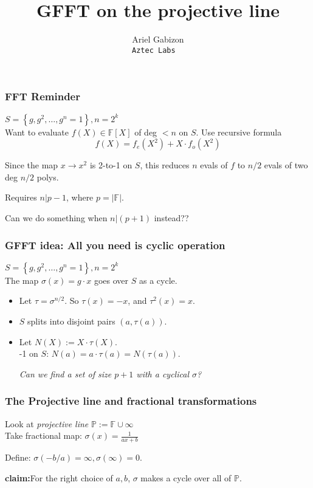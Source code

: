 \documentclass[shadesubsections,compress,14pt,mathserif]{beamer}
\title{\large{GFFT on the projective line}}    %
\author{\small{Ariel Gabizon}\\                 %
\tt{\footnotesize{Aztec Labs}                                       } }      %
\date{}                    %
\newcommand{\F}{\ensuremath{{\mathbb F}}}
\renewcommand{\P}{\ensuremath{{\mathbb P}}}
\newcommand{\set}[1]{\ensuremath{\left\{#1\right\}}}
\newcommand{\defeq}{\ensuremath{:=}}
\newcommand{\nl}{\\ \pause \vspace{0.2in}}
\begin{document}
\boldmath
\begin{frame}
  \titlepage
\end{frame}


\begin{frame}
 \frametitle{FFT Reminder}
 
 
 
 $S=\set{g,g^2,\ldots,g^{n}=1},n=2^k$\nl
 Want to evaluate $f(X)\in \F[X]$ of deg $<n$ on $S$.\pause
 Use recursive formula
 \[f(X)=f_e(X^2)+X\cdot f_o(X^2)\]
 
 Since the map $x\to x^2$ is 2-to-1 on $S$, this reduces $n$ evals of $f$ to $n/2$ evals of two deg $n/2$ polys.\nl

 
 Requires $n|p-1$, where $p=|\F|$.
 
 Can we do something when  $n|(p+1)$ instead?? 
 
\end{frame}
\begin{frame}
 \frametitle{GFFT idea: All you need is cyclic operation}
 $S=\set{g,g^2,\ldots,g^{n}=1},n=2^k$\\ \pause
The map $\sigma(x)=g\cdot x$ goes over $S$ as a cycle.\nl
\begin{itemize}
\item Let $\tau = \sigma^{n/2}$. So $\tau(x)=-x$, and $\tau^2(x)=x$.\pause
\item $S$ splits into disjoint pairs $(a,\tau(a))$.\pause
\item Let $N(X)\defeq X \cdot \tau(X)$.\\ -1 on $S$: $N(a)=a \cdot \tau(a) = N(\tau(a))$.\nl %

\textit{Can we find a set of size $p+1$ with a cyclical $\sigma$?}
\end{itemize}

\end{frame}
\begin{frame}
 \frametitle{The Projective line and fractional transformations}
 
 Look at \emph{projective line} $\P\defeq \F\cup\infty$\nl
 Take fractional map:
 $\sigma(x)= \frac{1}{ax+b}$
 
 Define: $\sigma(-b/a)=\infty,\sigma(\infty)=0$.\nl
 
 \textbf{claim:}For the right choice of $a,b$, $\sigma$ makes a cycle over all of \P.
 
 
 
\end{frame}
\end{document}
